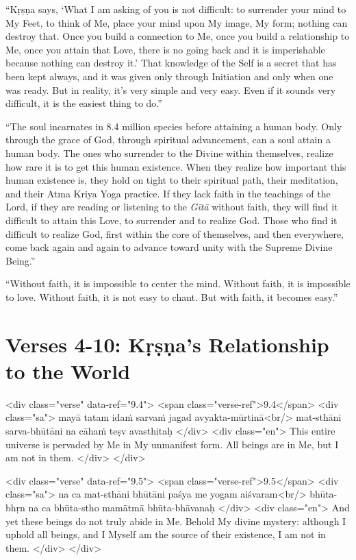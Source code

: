 \enquote{Kṛṣṇa says, \enquote{What I am asking of you is not difficult: to surrender your mind to My Feet, to think of Me, place your mind upon My image, My form; nothing can destroy that. Once you build a connection to Me, once you build a relationship to Me, once you attain that Love, there is no going back and it is imperishable because nothing can destroy it.} That knowledge of the Self is a secret that has been kept always, and it was given only through Initiation and only when one was ready. But in reality, it’s very simple and very easy. Even if it sounds very difficult, it is the easiest thing to do.}

\enquote{The soul incarnates in 8.4 million species before attaining a human body. Only through the grace of God, through spiritual advancement, can a soul attain a human body. The ones who surrender to the Divine within themselves, realize how rare it is to get this human existence. When they realize how important this human existence is, they hold on tight to their spiritual path, their meditation, and their Atma Kriya Yoga practice. If they lack faith in the teachings of the Lord, if they are reading or listening to the \textit{Gītā} without faith, they will find it difficult to attain this Love, to surrender and to realize God. Those who find it difficult to realize God, first within the core of themselves, and then everywhere, come back again and again to advance toward unity with the Supreme Divine Being.}

\enquote{Without faith, it is impossible to center the mind. Without faith, it is impossible to love. Without faith, it is not easy to chant. But with faith, it becomes easy.}

\section{Verses 4-10: Kṛṣṇa's Relationship to the World}\label{sec-verses-4-10-krsna-s-relationship-to-the-world}


\begin{html}
<div class="verse" data-ref="9.4">
  <span class="verse-ref">9.4</span>
  <div class="sa">
    mayā tatam idaṁ sarvaṁ jagad avyakta-mūrtinā<br/>
    mat-sthāni sarva-bhūtāni na cāhaṁ teṣv avasthitaḥ
  </div>
  <div class="en">
    This entire universe is pervaded by Me in My unmanifest form. All beings are in Me, but I am not in them.
  </div>
</div>
\end{html}



\begin{html}
<div class="verse" data-ref="9.5">
  <span class="verse-ref">9.5</span>
  <div class="sa">
    na ca mat-sthāni bhūtāni paśya me yogam aiśvaram<br/>
    bhūta-bhṛn na ca bhūta-stho mamātmā bhūta-bhāvanaḥ
  </div>
  <div class="en">
    And yet these beings do not truly abide in Me. Behold My divine mystery: although I uphold all beings, and I Myself am the source of their existence, I am not in them.
  </div>
</div>
\end{html}



